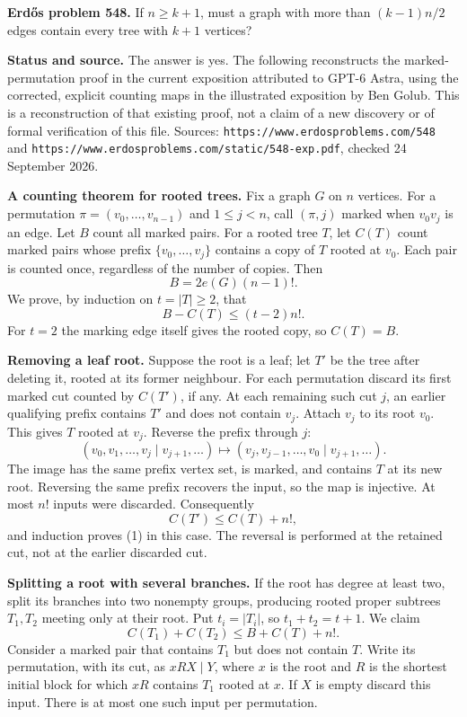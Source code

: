 \textbf{Erd\H{o}s problem 548.}
If $n\geq k+1$, must a graph with more than $(k-1)n/2$ edges contain every tree with $k+1$ vertices?

\textbf{Status and source.}
The answer is yes. The following reconstructs the marked-permutation proof in the current exposition attributed to GPT-6 Astra, using the corrected, explicit counting maps in the illustrated exposition by Ben Golub. This is a reconstruction of that existing proof, not a claim of a new discovery or of formal verification of this file.
Sources: \texttt{https://www.erdosproblems.com/548} and
\texttt{https://www.erdosproblems.com/static/548-exp.pdf}, checked 24 September 2026.

\textbf{A counting theorem for rooted trees.}
Fix a graph $G$ on $n$ vertices. For a permutation
$\pi=(v_0,\ldots,v_{n-1})$ and $1\leq j<n$, call $(\pi,j)$ marked when $v_0v_j$ is an edge. Let $B$ count all marked pairs. For a rooted tree $T$, let $C(T)$ count marked pairs whose prefix $\{v_0,\ldots,v_j\}$ contains a copy of $T$ rooted at $v_0$. Each pair is counted once, regardless of the number of copies. Then
\[
 B=2e(G)(n-1)!.
\]
We prove, by induction on $t=|T|\geq2$, that
\[
 B-C(T)\leq(t-2)n!.                                      \tag{1}
\]
For $t=2$ the marking edge itself gives the rooted copy, so $C(T)=B$.

\textbf{Removing a leaf root.}
Suppose the root is a leaf; let $T'$ be the tree after deleting it, rooted at its former neighbour. For each permutation discard its first marked cut counted by $C(T')$, if any. At each remaining such cut $j$, an earlier qualifying prefix contains $T'$ and does not contain $v_j$. Attach $v_j$ to its root $v_0$. This gives $T$ rooted at $v_j$. Reverse the prefix through $j$:
\[
 (v_0,v_1,\ldots,v_j\mid v_{j+1},\ldots)
 \longmapsto(v_j,v_{j-1},\ldots,v_0\mid v_{j+1},\ldots).
\]
The image has the same prefix vertex set, is marked, and contains $T$ at its new root. Reversing the same prefix recovers the input, so the map is injective. At most $n!$ inputs were discarded. Consequently
\[
 C(T')\leq C(T)+n!,
\]
and induction proves (1) in this case. The reversal is performed at the retained cut, not at the earlier discarded cut.

\textbf{Splitting a root with several branches.}
If the root has degree at least two, split its branches into two nonempty groups, producing rooted proper subtrees $T_1,T_2$ meeting only at their root. Put $t_i=|T_i|$, so $t_1+t_2=t+1$. We claim
\[
 C(T_1)+C(T_2)\leq B+C(T)+n!.                             \tag{2}
\]
Consider a marked pair that contains $T_1$ but does not contain $T$. Write its permutation, with its cut, as $xRX\mid Y$, where $x$ is the root and $R$ is the shortest initial block for which $xR$ contains $T_1$ rooted at $x$. If $X$ is empty discard this input. There is at most one such input per permutation.

